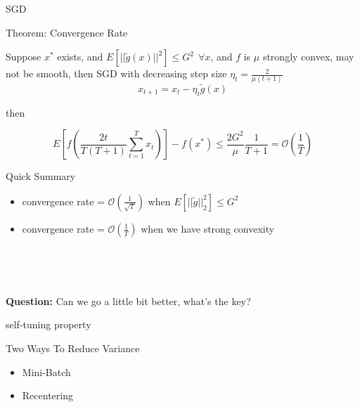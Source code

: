\documentclass[aspectratio=169,xcolor=dvipsnames]{beamer}
\begin{document}

\begin{frame}{SGD}


\begin{block}{Theorem: Convergence Rate}

Suppose $x^*$ exists, and $E[||\tilde g(x)||^2] \le G^2\ \ \forall x$, and $f$ is $\mu$ strongly convex, may not be smooth, then SGD with decreasing step size $\eta_t = \frac{2}{\mu (t + 1)}$
\begin{equation*}
	x_{t+1} = x_t - \eta_t \tilde g(x)
\end{equation*}

then 

\begin{equation*}
	E[f(\frac{2t}{T(T+1)} \sum_{t = 1}^T x_t)] - f(x^*) \le \frac{2 G^2}{\mu} \frac{1}{T+1} = \mathcal O(\frac{1}{T})
\end{equation*}


\end{block}


	
\end{frame}


\begin{frame}{Quick Summary}
	\begin{itemize}[<+->]
		\item convergence rate = $\mathcal O(\frac{1}{\sqrt T})$ when $E[||\tilde g||_2^2] \le G^2$
		\item convergence rate = $\mathcal O(\frac{1}{ T})$ when we have strong convexity
	\end{itemize}
	\
	
	\
	
	\textbf{Question:} Can we go a little bit better, what's the key?
	
\pause \begin{center}
	self-tuning property
\end{center}
\end{frame}


\begin{frame}{Two Ways To Reduce Variance}
\Large
\begin{itemize}
	\item Mini-Batch 
	\item Recentering
\end{itemize}
	
\end{frame}
\end{document}
